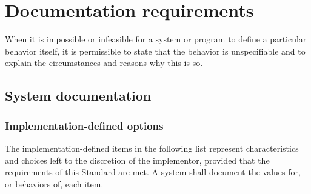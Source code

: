 \resetlinenumber
\chapter{Documentation requirements}
\label{doc}

When it is impossible or infeasible for a system or program to
define a particular behavior itself, it is permissible to state
that the behavior is unspecifiable and to explain the circumstances
and reasons why this is so.

\section{System documentation} %
\label{doc:system}

\subsection{Implementation-defined options} %

The implementation-defined items in the following list represent
characteristics and choices left to the discretion of the
implementor, provided that the requirements of this Standard are
met. A system shall document the values for, or behaviors of, each
item.

